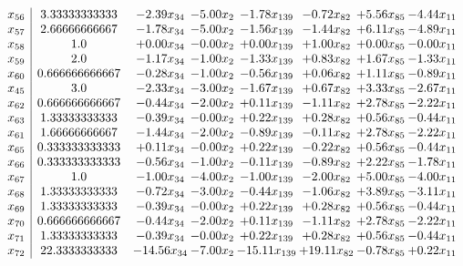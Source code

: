 \documentclass[8pt]{article}
\begin{document}
\[\begin{array}{c| c c@{\hskip 2pt} c@{\hskip 2pt} c@{\hskip 2pt} c@{\hskip 2pt} c@{\hskip 2pt} c@{\hskip 2pt} }
 x_{56}   &  3.33333333333 & -2.39 x_{34} & -5.00 x_{2} & -1.78 x_{139} & -0.72 x_{82} & +  5.56 x_{85} & -4.44 x_{11}\\
 x_{57}   &  2.66666666667 & -1.78 x_{34} & -5.00 x_{2} & -1.56 x_{139} & -1.44 x_{82} & +  6.11 x_{85} & -4.89 x_{11}\\
 x_{58}   &  1.0 & +  0.00 x_{34} & -0.00 x_{2} & +  0.00 x_{139} & +  1.00 x_{82} & +  0.00 x_{85} & -0.00 x_{11}\\
 x_{59}   &  2.0 & -1.17 x_{34} & -1.00 x_{2} & -1.33 x_{139} & +  0.83 x_{82} & +  1.67 x_{85} & -1.33 x_{11}\\
 x_{60}   &  0.666666666667 & -0.28 x_{34} & -1.00 x_{2} & -0.56 x_{139} & +  0.06 x_{82} & +  1.11 x_{85} & -0.89 x_{11}\\
 x_{45}   &  3.0 & -2.33 x_{34} & -3.00 x_{2} & -1.67 x_{139} & +  0.67 x_{82} & +  3.33 x_{85} & -2.67 x_{11}\\
 x_{62}   &  0.666666666667 & -0.44 x_{34} & -2.00 x_{2} & +  0.11 x_{139} & -1.11 x_{82} & +  2.78 x_{85} & -2.22 x_{11}\\
 x_{63}   &  1.33333333333 & -0.39 x_{34} & -0.00 x_{2} & +  0.22 x_{139} & +  0.28 x_{82} & +  0.56 x_{85} & -0.44 x_{11}\\
 x_{61}   &  1.66666666667 & -1.44 x_{34} & -2.00 x_{2} & -0.89 x_{139} & -0.11 x_{82} & +  2.78 x_{85} & -2.22 x_{11}\\
 x_{65}   &  0.333333333333 & +  0.11 x_{34} & -0.00 x_{2} & +  0.22 x_{139} & -0.22 x_{82} & +  0.56 x_{85} & -0.44 x_{11}\\
 x_{66}   &  0.333333333333 & -0.56 x_{34} & -1.00 x_{2} & -0.11 x_{139} & -0.89 x_{82} & +  2.22 x_{85} & -1.78 x_{11}\\
 x_{67}   &  1.0 & -1.00 x_{34} & -4.00 x_{2} & -1.00 x_{139} & -2.00 x_{82} & +  5.00 x_{85} & -4.00 x_{11}\\
 x_{68}   &  1.33333333333 & -0.72 x_{34} & -3.00 x_{2} & -0.44 x_{139} & -1.06 x_{82} & +  3.89 x_{85} & -3.11 x_{11}\\
 x_{69}   &  1.33333333333 & -0.39 x_{34} & -0.00 x_{2} & +  0.22 x_{139} & +  0.28 x_{82} & +  0.56 x_{85} & -0.44 x_{11}\\
 x_{70}   &  0.666666666667 & -0.44 x_{34} & -2.00 x_{2} & +  0.11 x_{139} & -1.11 x_{82} & +  2.78 x_{85} & -2.22 x_{11}\\
 x_{71}   &  1.33333333333 & -0.39 x_{34} & -0.00 x_{2} & +  0.22 x_{139} & +  0.28 x_{82} & +  0.56 x_{85} & -0.44 x_{11}\\
 x_{72}   &  22.3333333333 & -14.56 x_{34} & -7.00 x_{2} & -15.11 x_{139} & + 19.11 x_{82} & -0.78 x_{85} & +  0.22 x_{11}\\

\end{array}\]
\end{document}
